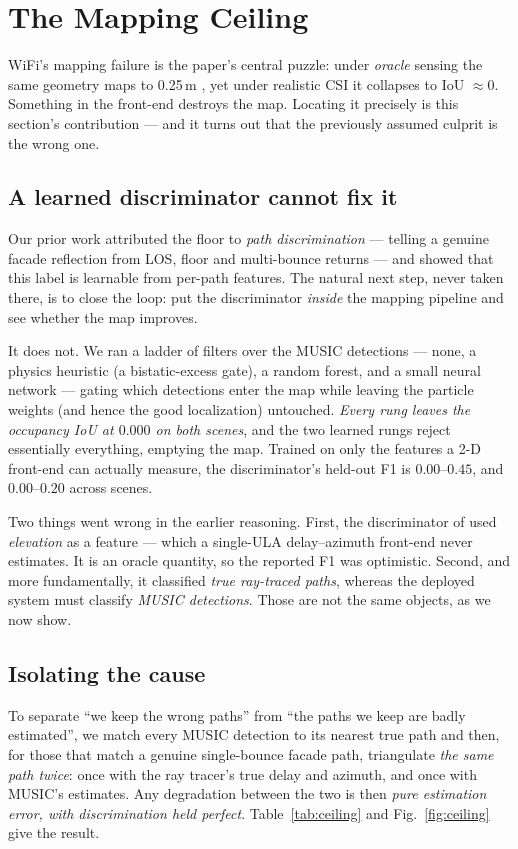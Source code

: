 \documentclass[journal]{IEEEtran}
\newcommand{\SI}[2]{#1\,#2}
\begin{document}
\section{The Mapping Ceiling}\label{sec:ceiling}

WiFi's mapping failure is the paper's central puzzle: under \emph{oracle} sensing the same
geometry maps to \SI{0.25}{m} \cite{fetna2026wifiradar}, yet under realistic CSI it
collapses to IoU $\approx0$. Something in the front-end destroys the map. Locating it
precisely is this section's contribution --- and it turns out that the previously assumed
culprit is the wrong one.

\subsection{A learned discriminator cannot fix it}
Our prior work \cite{fetna2026wifiradar} attributed the floor to \emph{path
discrimination} --- telling a genuine facade reflection from LOS, floor and multi-bounce
returns --- and showed that this label is learnable from per-path features. The natural
next step, never taken there, is to close the loop: put the discriminator \emph{inside} the
mapping pipeline and see whether the map improves.

It does not. We ran a ladder of filters over the MUSIC detections --- none, a physics
heuristic (a bistatic-excess gate), a random forest, and a small neural network --- gating
which detections enter the map while leaving the particle weights (and hence the good
localization) untouched. \emph{Every rung leaves the occupancy IoU at $0.000$ on both
scenes}, and the two learned rungs reject essentially everything, emptying the map. Trained
on only the features a 2-D front-end can actually measure, the discriminator's held-out F1
is $0.00$--$0.45$, and $0.00$--$0.20$ across scenes.

Two things went wrong in the earlier reasoning. First, the discriminator of
\cite{fetna2026wifiradar} used \emph{elevation} as a feature --- which a single-ULA
delay--azimuth front-end never estimates. It is an oracle quantity, so the reported F1 was
optimistic. Second, and more fundamentally, it classified \emph{true ray-traced paths},
whereas the deployed system must classify \emph{MUSIC detections}. Those are not the same
objects, as we now show.

\subsection{Isolating the cause}
To separate ``we keep the wrong paths'' from ``the paths we keep are badly estimated'', we
match every MUSIC detection to its nearest true path and then, for those that match a
genuine single-bounce facade path, triangulate \emph{the same path twice}: once with the
ray tracer's true delay and azimuth, and once with MUSIC's estimates. Any degradation
between the two is then \emph{pure estimation error, with discrimination held perfect}.
Table~\ref{tab:ceiling} and Fig.~\ref{fig:ceiling} give the result.
\end{document}

